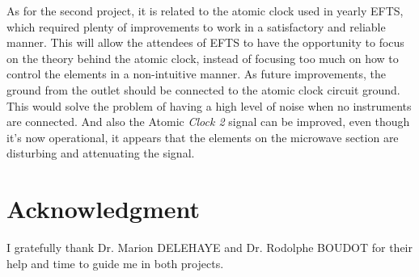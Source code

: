 \documentclass[a4paper,12pt]{article}
\begin{document}
As for the second project, it is related to the atomic clock used in yearly EFTS, which required plenty of improvements to work in a satisfactory and reliable manner. This will allow the attendees of EFTS to have the opportunity to focus on the theory behind the atomic clock, instead of focusing too much on how to control the elements in a non-intuitive manner. As future improvements, the ground from the outlet should be connected to the atomic clock circuit ground. This would solve the problem of having a high level of noise when no instruments are connected. And also the Atomic \textit{Clock 2} signal can be improved, even though it's now operational, it appears that the elements on the microwave section are disturbing and attenuating the signal.
\section{Acknowledgment}
I gratefully thank Dr. Marion DELEHAYE and Dr. Rodolphe BOUDOT for their help and time to guide me in both projects.
\end{document}

